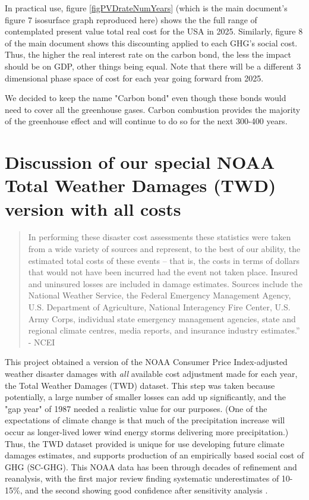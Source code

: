 \documentclass{article}
\begin{document}
In practical use, figure \ref{figPVDrateNumYears} (which is the main document's figure 7 isosurface graph reproduced here) shows the the full range of contemplated present value total real cost for the USA in 2025. Similarly, figure 8 of the main document shows this discounting applied to each GHG's social cost. Thus, the higher the real interest rate on the carbon bond, the less the impact should be on GDP, other things being equal. Note that there will be a different 3 dimensional phase space of cost for each year going forward from 2025. 

We decided to keep the name "Carbon bond" even though these bonds would need to cover all the greenhouse gases. Carbon combustion provides the majority of the greenhouse effect and will continue to do so for the next 300-400 years. 


\section{Discussion of our special NOAA Total Weather Damages (TWD) version with all costs}

\begin{quote}
 In performing these disaster cost assessments these statistics were taken from a wide variety of sources and represent, to the best of our ability, the estimated total costs of these events -- that is, the costs in terms of dollars that would not have been incurred had the event not taken place. Insured and uninsured losses are included in damage estimates. Sources include the National Weather Service, the Federal Emergency Management Agency, U.S. Department of Agriculture, National Interagency Fire Center, U.S. Army Corps, individual state emergency management agencies, state and regional climate centres, media reports, and insurance industry estimates.” - NCEI  \cite{NOAAbillionDlr} 
\end{quote} 

This project obtained a version of the NOAA Consumer Price Index-adjusted weather disaster damages\cite{NOAAbillionDlr} with \emph{all} available cost adjustment made for each year, the Total Weather Damages (TWD) dataset. This step was taken because potentially, a large number of smaller losses can add up significantly, and the "gap year" of 1987 needed a realistic value for our purposes. (One of the expectations of climate change is that much of the precipitation increase will occur as longer-lived lower wind energy storms delivering more precipitation.) Thus, the TWD dataset provided is unique for use developing future climate damages estimates, and supports production of an empirically based social cost of GHG (SC-GHG). This NOAA data has been through decades of refinement and reanalysis, with the first major review \cite{Smith2013billion-dollarClimateBiases} finding systematic underestimates of 10-15\%, and the second showing good confidence after sensitivity analysis \cite{Smith2015QuantifyingUncertaintyClimateDisaster}. 
\end{document}

